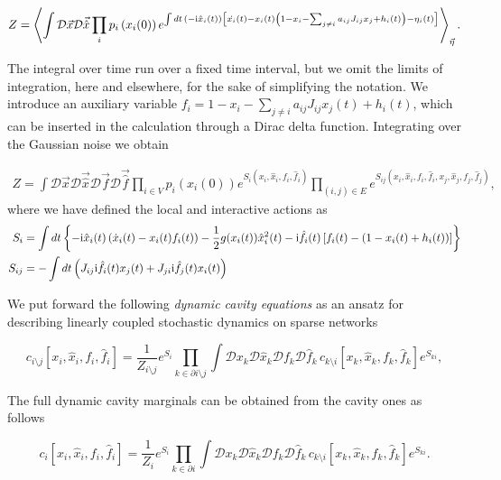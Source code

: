 \documentclass[
    preprint,
    linenumbers,
    amsmath,amssymb,amsfonts,
    aps, physrev,
    superscriptaddress,
    10pt,
    bibnotes
    ]{revtex4-2}
\begin{document}
\begin{equation}
Z=\left\langle \int\mathcal{D}\vec{x}\mathcal{D}\vec{\hat{x}}\prod_{i}p_{i}\left(x_{i}(0)\right)e^{\int dt\,({-{\rm i}}\hat{x}_{i}(t))\left[\dot{x_{i}}(t)-x_{i}(t)\left(1-x_{i}-\sum_{j\neq i}a_{ij}J_{ij}x_{j}+h_{i}(t)\right)-\eta_i(t)\right]}\right\rangle _{\vec{\eta}}.
\end{equation}

The integral over time run over a fixed time interval, but we omit the limits of integration, here and elsewhere, for the sake of simplifying the notation. We introduce an auxiliary variable $f_i=1-x_i-\sum_{j\neq i}a_{ij}J_{ij}x_j(t)+h_i(t)$, which can be inserted in the calculation through a Dirac delta function. Integrating over the Gaussian noise we obtain

\begin{align}
Z =\int\mathcal{D}\vec{x}\mathcal{D}\vec{\hat{x}}\mathcal{D}\vec{f}\mathcal{D}\vec{\hat{f}}\prod_{i\in V}p_{i}\left(x_{i}(0)\right)e^{S_i\left(x_i,\hat{x}_i,f_i,\hat{f}_i\right)}\prod_{(i,j)\in E}e^{S_{ij}\left(x_i,\hat{x}_i,f_i,\hat{f}_i,x_j,\hat{x}_j,f_j,\hat{f}_j\right)},
\end{align}
where we have defined the local and interactive actions as
\begin{align}
  S_i & = \int dt \left\{-{\rm i}\hat{x}_i(t)\left(\dot{x}_i(t)-x_i(t)f_i(t)\right)-\frac{1}{2}g(x_i(t))\hat{x}_i^2(t)-{\rm i}\hat{f}_i(t)\left[f_i(t)-\left(1-x_i(t)+h_i(t)\right)\right] \right\}\\
  S_{ij} & = -\int dt\left(J_{ij}{\rm i}\hat{f}_i(t)x_j(t)+J_{ji}{\rm i}\hat{f}_j(t)x_i(t) \right)
\end{align}

We put forward the following \textit{dynamic cavity equations} as an ansatz for describing linearly coupled stochastic dynamics on sparse networks

\begin{equation}
  c_{i\setminus j}[x_{i},\hat{x}_{i}, f_i, \hat{f}_i] = \frac{1}{Z_{i\setminus j}}e^{S_i}\prod_{k\in\partial i \setminus j}\int{\mathcal{D}x_k\mathcal{D}\hat{x}_k\mathcal{D}f_k\mathcal{D}\hat{f}_k} \, c_{k\setminus i}[x_{k},\hat{x}_{k}, f_k, \hat{f}_k] e^{S_{ki}},\label{eq:cavity_marg}
\end{equation}

The full dynamic cavity marginals can be obtained from the cavity
ones as follows 

\begin{equation}
  c_{i}[x_{i},\hat{x}_{i}, f_i, \hat{f}_i]=\frac{1}{Z_{i}}e^{S_i}\prod_{k\in\partial i}\int{\mathcal{D}x_k\mathcal{D}\hat{x}_k\mathcal{D}f_k\mathcal{D}\hat{f}_k} \, c_{k\setminus i}[x_{k},\hat{x}_{k}, f_k, \hat{f}_k] e^{S_{ki}}.\label{eq:marg_RRG}
\end{equation}
\end{document}
